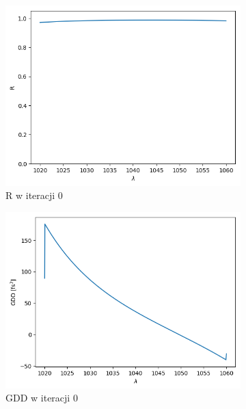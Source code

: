 \begin{figure} [ht!]
    \centering
    \begin{subfigure}[b]{0.30\textwidth}
        \includegraphics[width=\linewidth]{figures/wyniki/2stopien/dbr/result_Rresult0.png}
        \caption{R w iteracji 0}
    \end{subfigure}
            \begin{subfigure}[b]{0.31\textwidth}
        \includegraphics[width=\linewidth]{figures/wyniki/2stopien/dbr/result_gddresult0.png}
        \caption{GDD w iteracji 0}
    \end{subfigure}
        \begin{subfigure}[b]{0.32\textwidth}

\end{subfigure}
\end{figure}
